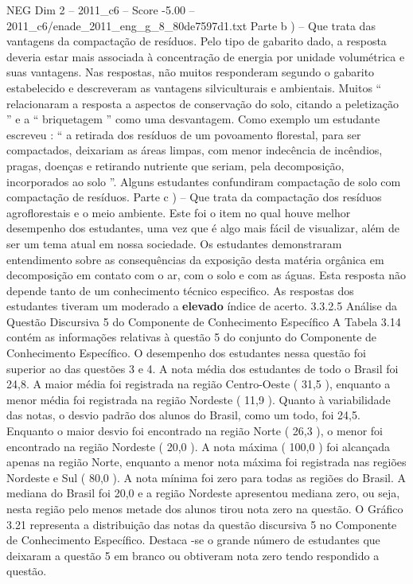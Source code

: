 \begin{textsample}{NEG Dim 2 – 2011\_c6 – Score -5.00 – 2011\_c6/enade\_2011\_eng\_g\_8\_80de7597d1.txt}
Parte b ) – Que trata das vantagens da compactação de resíduos.
Pelo tipo de gabarito dado, a resposta deveria estar mais associada à concentração de energia por unidade volumétrica e suas vantagens.
Nas respostas, não muitos responderam segundo o gabarito estabelecido e descreveram as vantagens silviculturais e ambientais.
Muitos “ relacionaram a resposta a aspectos de conservação do solo, citando a peletização ” e a “ briquetagem ” como uma desvantagem.
Como exemplo um estudante escreveu : “ a retirada dos resíduos de um povoamento florestal, para ser compactados, deixariam as áreas limpas, com menor indecência de incêndios, pragas, doenças e retirando nutriente que seriam, pela decomposição, incorporados ao solo ”.
Alguns estudantes confundiram compactação de solo com compactação de resíduos.
Parte c ) – Que trata da compactação dos resíduos agroflorestais e o meio ambiente.
Este foi o item no qual houve melhor desempenho dos estudantes, uma vez que é algo mais fácil de visualizar, além de ser um tema atual em nossa sociedade.
Os estudantes demonstraram entendimento sobre as consequências da exposição desta matéria orgânica em decomposição em contato com o ar, com o solo e com as águas.
Esta resposta não depende tanto de um conhecimento técnico especifico.
As respostas dos estudantes tiveram um moderado a \textbf{elevado} índice de acerto. 3.3.2.5 Análise da Questão Discursiva 5 do Componente de Conhecimento Específico A Tabela 3.14 contém as informações relativas à questão 5 do conjunto do Componente de Conhecimento Específico.
O desempenho dos estudantes nessa questão foi superior ao das questões 3 e 4.
A nota média dos estudantes de todo o Brasil foi 24,8.
A maior média foi registrada na região Centro-Oeste ( 31,5 ), enquanto a menor média foi registrada na região Nordeste ( 11,9 ).
Quanto à variabilidade das notas, o desvio padrão dos alunos do Brasil, como um todo, foi 24,5.
Enquanto o maior desvio foi encontrado na região Norte ( 26,3 ), o menor foi encontrado na região Nordeste ( 20,0 ).
A nota máxima ( 100,0 ) foi alcançada apenas na região Norte, enquanto a menor nota máxima foi registrada nas regiões Nordeste e Sul ( 80,0 ).
A nota mínima foi zero para todas as regiões do Brasil.
A mediana do Brasil foi 20,0 e a região Nordeste apresentou mediana zero, ou seja, nesta região pelo menos metade dos alunos tirou nota zero na questão.
O Gráfico 3.21 representa a distribuição das notas da questão discursiva 5 no Componente de Conhecimento Específico.
Destaca -se o grande número de estudantes que deixaram a questão 5 em branco ou obtiveram nota zero tendo respondido a questão.

\end{textsample}
